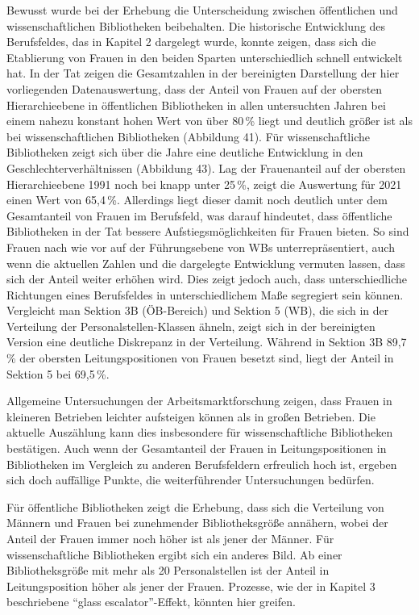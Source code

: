 \documentclass[a4paper,
fontsize=11pt,
oneside,
numbers=noperiodatend,
parskip=half-,
bibliography=totoc,
final
]{scrartcl}
\begin{document}
Bewusst wurde bei der Erhebung die Unterscheidung zwischen öffentlichen
und wissenschaftlichen Bibliotheken beibehalten. Die historische
Entwicklung des Berufsfeldes, das in Kapitel 2 dargelegt wurde, konnte
zeigen, dass sich die Etablierung von Frauen in den beiden Sparten
unterschiedlich schnell entwickelt hat. In der Tat zeigen die
Gesamtzahlen in der bereinigten Darstellung der hier vorliegenden
Datenauswertung, dass der Anteil von Frauen auf der obersten
Hierarchieebene in öffentlichen Bibliotheken in allen untersuchten
Jahren bei einem nahezu konstant hohen Wert von über 80\,\% liegt und
deutlich größer ist als bei wissenschaftlichen Bibliotheken (Abbildung
41). Für wissenschaftliche Bibliotheken zeigt sich über die Jahre eine
deutliche Entwicklung in den Geschlechterverhältnissen (Abbildung 43).
Lag der Frauenanteil auf der obersten Hierarchieebene 1991 noch bei
knapp unter 25\,\%, zeigt die Auswertung für 2021 einen Wert von 65,4\,\%.
Allerdings liegt dieser damit noch deutlich unter dem Gesamtanteil von
Frauen im Berufsfeld, was darauf hindeutet, dass öffentliche
Bibliotheken in der Tat bessere Aufstiegsmöglichkeiten für Frauen
bieten. So sind Frauen nach wie vor auf der Führungsebene von WBs
unterrepräsentiert, auch wenn die aktuellen Zahlen und die dargelegte
Entwicklung vermuten lassen, dass sich der Anteil weiter erhöhen wird.
Dies zeigt jedoch auch, dass unterschiedliche Richtungen eines
Berufsfeldes in unterschiedlichem Maße segregiert sein können.
Vergleicht man Sektion 3B (ÖB-Bereich) und Sektion 5 (WB), die sich in
der Verteilung der Personalstellen-Klassen ähneln, zeigt sich in der
bereinigten Version eine deutliche Diskrepanz in der Verteilung. Während
in Sektion 3B 89,7\,\% der obersten Leitungspositionen von Frauen besetzt
sind, liegt der Anteil in Sektion 5 bei 69,5\,\%.

Allgemeine Untersuchungen der Arbeitsmarktforschung zeigen, dass Frauen
in kleineren Betrieben leichter aufsteigen können als in großen
Betrieben. Die aktuelle Auszählung kann dies insbesondere für
wissenschaftliche Bibliotheken bestätigen. Auch wenn der Gesamtanteil
der Frauen in Leitungspositionen in Bibliotheken im Vergleich zu anderen
Berufsfeldern erfreulich hoch ist, ergeben sich doch auffällige Punkte,
die weiterführender Untersuchungen bedürfen.

Für öffentliche Bibliotheken zeigt die Erhebung, dass sich die
Verteilung von Männern und Frauen bei zunehmender Bibliotheksgröße
annähern, wobei der Anteil der Frauen immer noch höher ist als jener der
Männer. Für wissenschaftliche Bibliotheken ergibt sich ein anderes Bild.
Ab einer Bibliotheksgröße mit mehr als 20 Personalstellen ist der Anteil
in Leitungsposition höher als jener der Frauen. Prozesse, wie der in
Kapitel 3 beschriebene \enquote{glass escalator}-Effekt, könnten hier
greifen.
\end{document}
